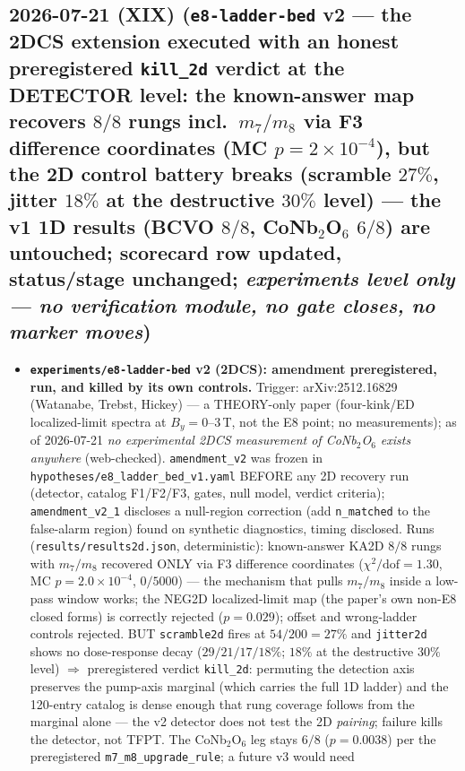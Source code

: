 \subsection*{2026-07-21 (XIX) (\texttt{e8-ladder-bed} v2 --- the 2DCS extension executed with an honest preregistered \texttt{kill\_2d} verdict at the DETECTOR level: the known-answer map recovers $8/8$ rungs incl.\ $m_7/m_8$ via F3 difference coordinates (MC $p=2\times10^{-4}$), but the 2D control battery breaks (scramble $27\%$, jitter $18\%$ at the destructive $30\%$ level) --- the v1 1D results (BCVO $8/8$, CoNb$_2$O$_6$ $6/8$) are untouched; scorecard row updated, status/stage unchanged; \emph{experiments level only --- no verification module, no gate closes, no marker moves})}
\begin{itemize}[leftmargin=1.5em]
\item \textbf{\texttt{experiments/e8-ladder-bed} v2 (2DCS): amendment preregistered, run, and killed
by its own controls.} Trigger: arXiv:2512.16829 (Watanabe, Trebst, Hickey) --- a THEORY-only paper
(four-kink/ED localized-limit spectra at $B_y=0$--$3$\,T, not the E8 point; no measurements); as of
2026-07-21 \emph{no experimental 2DCS measurement of CoNb$_2$O$_6$ exists anywhere} (web-checked).
\texttt{amendment\_v2} was frozen in \texttt{hypotheses/e8\_ladder\_bed\_v1.yaml} BEFORE any 2D
recovery run (detector, catalog F1/F2/F3, gates, null model, verdict criteria);
\texttt{amendment\_v2\_1} discloses a null-region correction (add \texttt{n\_matched} to the
false-alarm region) found on synthetic diagnostics, timing disclosed. Runs
(\texttt{results/results2d.json}, deterministic): known-answer KA2D $8/8$ rungs with $m_7/m_8$
recovered ONLY via F3 difference coordinates ($\chi^2/\mathrm{dof}=1.30$, MC $p=2.0\times10^{-4}$,
$0/5000$) --- the mechanism that pulls $m_7/m_8$ inside a low-pass window works; the NEG2D
localized-limit map (the paper's own non-E8 closed forms) is correctly rejected ($p=0.029$); offset
and wrong-ladder controls rejected. BUT \texttt{scramble2d} fires at $54/200=27\%$ and
\texttt{jitter2d} shows no dose-response decay ($29/21/17/18\%$; $18\%$ at the destructive $30\%$
level) $\Rightarrow$ preregistered verdict \texttt{kill\_2d}: permuting the detection axis preserves
the pump-axis marginal (which carries the full 1D ladder) and the 120-entry catalog is dense enough
that rung coverage follows from the marginal alone --- the v2 detector does not test the 2D
\emph{pairing}; failure kills the detector, not TFPT. The CoNb$_2$O$_6$ leg stays $6/8$
($p=0.0038$) per the preregistered \texttt{m7\_m8\_upgrade\_rule}; a future v3 would need

\end{itemize}

